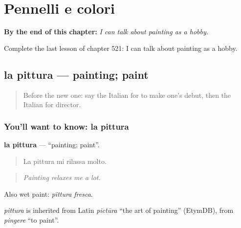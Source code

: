 
\chapter{Pennelli e colori}
\label{ch:it-pennelli-e-colori}

\begin{chapteropening}
\textbf{By the end of this chapter:} \emph{I can talk about painting as a hobby.}

Complete the last lesson of chapter 521: I can talk about painting as a hobby.
\end{chapteropening}

\section[la pittura]{la pittura — painting; paint}

\label{lesson:IT-C521-pittura}



\begin{quote}
Before the new one: say the Italian for to make one's debut, then the Italian for director.
\end{quote}

\subsection*{You'll want to know: la pittura}
\textbf{la pittura} — \textquotedblleft{}painting; paint\textquotedblright{}.

\begin{quote}
La pittura mi rilassa molto.
\end{quote}

\begin{quote}
\emph{Painting relaxes me a lot.}
\end{quote}

Also wet paint: \emph{pittura fresca}.

\begin{cousinweb}
\emph{pittura} is inherited from Latin \emph{pictūra} \textquotedblleft{}the art of painting\textquotedblright{} (EtymDB), from \emph{pingere} \textquotedblleft{}to paint\textquotedblright{}.
\end{cousinweb}

